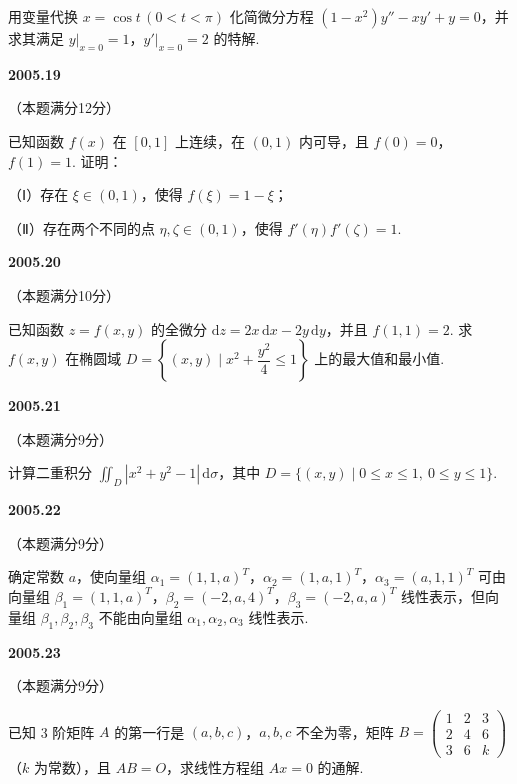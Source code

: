\documentclass[UTF8,12pt,fontset=windows]{ctexart}
\begin{document}
用变量代换 $x = \cos t\,(0 < t < \pi)$ 化简微分方程 $(1-x^2)y'' - xy' + y = 0$，并求其满足 $y\big|_{x=0} = 1$，$y'\big|_{x=0} = 2$ 的特解.

\vfill
\newpage
{\large\bfseries 2005.19}

（本题满分12分）

已知函数 $f(x)$ 在 $[0,1]$ 上连续，在 $(0,1)$ 内可导，且 $f(0) = 0$，$f(1) = 1$. 证明：

（Ⅰ）存在 $\xi \in (0,1)$，使得 $f(\xi) = 1 - \xi$；

（Ⅱ）存在两个不同的点 $\eta, \zeta \in (0,1)$，使得 $f'(\eta)f'(\zeta) = 1$.

\vfill
\newpage
{\large\bfseries 2005.20}

（本题满分10分）

已知函数 $z = f(x,y)$ 的全微分 $\mathrm{d}z = 2x\,\mathrm{d}x - 2y\,\mathrm{d}y$，并且 $f(1,1) = 2$. 求 $f(x,y)$ 在椭圆域 $D = \left\{(x,y) \mid x^2 + \dfrac{y^2}{4} \leqslant 1\right\}$ 上的最大值和最小值.

\vfill
\newpage
{\large\bfseries 2005.21}

（本题满分9分）

计算二重积分 $\displaystyle\iint_D \left|x^2+y^2-1\right|\,\mathrm{d}\sigma$，其中 $D = \{(x,y) \mid 0 \leqslant x \leqslant 1,\ 0 \leqslant y \leqslant 1\}$.

\vfill
\newpage
{\large\bfseries 2005.22}

（本题满分9分）

确定常数 $a$，使向量组 $\alpha_1 = (1,1,a)^T$，$\alpha_2 = (1,a,1)^T$，$\alpha_3 = (a,1,1)^T$ 可由向量组 $\beta_1 = (1,1,a)^T$，$\beta_2 = (-2,a,4)^T$，$\beta_3 = (-2,a,a)^T$ 线性表示，但向量组 $\beta_1,\beta_2,\beta_3$ 不能由向量组 $\alpha_1,\alpha_2,\alpha_3$ 线性表示.

\vfill
\newpage
{\large\bfseries 2005.23}

（本题满分9分）

已知 3 阶矩阵 $A$ 的第一行是 $(a,b,c)$，$a,b,c$ 不全为零，矩阵 $B = \begin{pmatrix} 1 & 2 & 3 \\ 2 & 4 & 6 \\ 3 & 6 & k \end{pmatrix}$（$k$ 为常数），且 $AB = O$，求线性方程组 $Ax = 0$ 的通解.

\vfill
\end{document}
